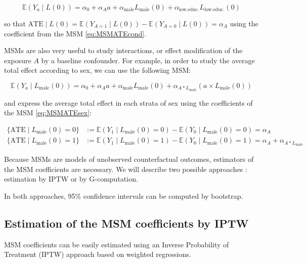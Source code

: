 \documentclass[
]{book}
\begin{document}
\begin{equation} 
  \mathbb{E}(Y_a \mid L(0)) = \alpha_0 + \alpha_A a + \alpha_\text{male} L_\text{male}(0) + \alpha_\text{low.educ.} L_\text{low.educ.}(0)
  \label{eq:MSMATEcond}
\end{equation}

so that \(\text{ATE} \mid L(0) = \mathbb{E}(Y_{A=1} \mid L(0)) - \mathbb{E}(Y_{A=0} \mid L(0)) = \alpha_A\) using the coefficient from the MSM \eqref{eq:MSMATEcond}.

MSMs are also very useful to study interactions, or effect modification of the exposure \(A\) by a baseline confounder. For example, in order to study the average total effect according to sex, we can use the following MSM:

\begin{equation} 
  \mathbb{E}(Y_a \mid L_\text{male}(0)) = \alpha_0 + \alpha_A a + \alpha_\text{male} L_\text{male}(0) + \alpha_{A \ast L_\text{male}} \left(a \times L_\text{male}(0)\right)
  \label{eq:MSMATEsex}
\end{equation}

and express the average total effect in each strata of sex using the coefficients of the MSM \eqref{eq:MSMATEsex}:

\begin{align*}
 \{\text{ATE} \mid L_\text{male}(0) = 0\} &:= \mathbb{E}(Y_1 \mid L_\text{male}(0) = 0) - \mathbb{E}(Y_0 \mid L_\text{male}(0) = 0) = \alpha_A \\
 \{\text{ATE} \mid L_\text{male}(0) = 1\} &:= \mathbb{E}(Y_1 \mid L_\text{male}(0) = 1) - \mathbb{E}(Y_0 \mid L_\text{male}(0) = 1) = \alpha_A + \alpha_{A \ast L_\text{male}}
\end{align*}

Because MSMs are models of unobserved counterfactual outcomes, estimators of the MSM coefficients are necessary. We will describe two possible approaches : estimation by IPTW or by G-computation.

In both approaches, 95\% confidence intervals can be computed by bootstrap.

\hypertarget{estimation-of-the-msm-coefficients-by-iptw}{%
\subsection{Estimation of the MSM coefficients by IPTW}\label{estimation-of-the-msm-coefficients-by-iptw}}

MSM coefficients can be easily estimated using an Inverse Probability of Treatment (IPTW) approach based on weighted regressions.
\end{document}
